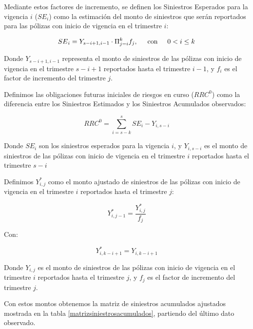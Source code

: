 \documentclass[11pt,twoside,openright,spanish]{report}
\numberwithin{equation}{chapter}
\numberwithin{figure}{chapter}
\numberwithin{table}{chapter}
\begin{document}
	Mediante estos factores de incremento, se definen los Siniestros Esperados para la vigencia $i$ (${SE}_{i}$) como la estimación del monto de siniestros que serán reportados para las pólizas con inicio de vigencia en el trimestre $i$:
	
	$${SE}_{i}={Y}_{s-i+1,i-1}\cdot\Pi_{j=i}^{k}{f}_{j},\hspace{0.5cm}\text{con}\hspace{0.5cm}0< i\le k$$
	

	Donde ${Y}_{s-i+1,i-1}$ representa el monto de siniestros de las pólizas con inicio de vigencia en el trimestre $s-i+1$ reportados hasta el trimestre $i-1$, y ${f}_{i}$ es el factor de incremento del trimestre $j$. 

	Definimos las obligaciones futuras iniciales de riesgos en curso (${RRC}^{0}$) como la diferencia entre los Siniestros Estimados y los Siniestros Acumulados observados:
	
	$${RRC}^{0}=\sum _{i=s-k}^{s}{SE}_{i}-{Y}_{i,s-i}$$ 

	Donde ${SE}_{i}$ son los siniestros esperados para la vigencia $i$, y ${Y}_{i,s-i}$ es el monto de siniestros de las pólizas con inicio de vigencia en el trimestre $i$ reportados hasta el trimestre $s-i$
		 
	Definimos ${Y}_{i,j}^{*}$ como el monto ajustado de siniestros de las pólizas con inicio de vigencia en el trimestre $i$ reportados hasta el trimestre $j$:
	
	$${Y}_{i,j-1}^{*}=\frac{{Y}_{i,j}^{*}}{{f}_{j}}$$

	Con:

	$${Y}_{i,k-i+1}^{*}={Y}_{i,k-i+1}$$	

	Donde ${Y}_{i,j}$ es el monto de siniestros de las pólizas con inicio de vigencia en el trimestre $i$ reportados hasta el trimestre $j$, y ${f}_{j}$ es el factor de incremento del trimestre $j$.

	Con estos montos obtenemos la matriz de siniestros acumulados ajustados mostrada en la tabla \ref{matrizsiniestrosacumulados}, partiendo del último dato observado.
		
\end{document}
